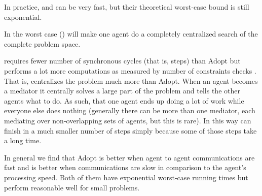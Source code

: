 In practice,  and \optapo{} can be very fast, but their
theoretical worst-case bound is still exponential.

\begin{theorem}
  \label{th:apowc}
  In the worst case  (\optapo) will make one
  agent do a completely centralized search of the complete problem
  space.
\end{theorem}

\optapo{} requires fewer number of synchronous cycles (that is, steps)
than Adopt but performs a lot more computations as measured by number
of constraints checks \cite{davin05a}. That is, \optapo{} centralizes
the problem much more than Adopt.  When an agent becomes a mediator it
centrally solves a large part of the problem and tells the other
agents what to do. As such, that one agent ends up doing a lot of work
while everyone else does nothing (generally there can be more than one
mediator, each mediating over non-overlapping sets of agents, but this
is rare). In this way \optapo{} can finish in a much smaller number of
steps simply because some of those steps take a long time.

In general we find that Adopt is better when agent to agent
communications are fast and \optapo is better when communications are
slow in comparison to the agent's processing speed. Both of them have
exponential worst-case running times but perform reasonable well for
small problems.



